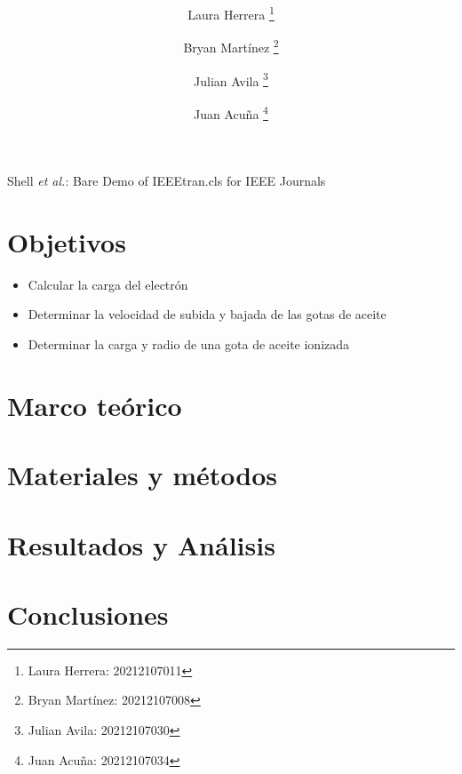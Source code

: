 \documentclass[journal, table]{IEEEtran}
\begin{document}
\title{\textbf{} \\
    \small{}}

\author[*]{Laura Herrera
    \thanks{Laura Herrera: 20212107011}}
\author[*]{Bryan Martínez
    \thanks{Bryan Martínez: 20212107008}}
\author[*]{Julian Avila
    \thanks{Julian Avila: 20212107030}}
\author[*]{Juan Acuña
    \thanks{Juan Acuña: 20212107034}}



\markboth{}
{Shell \MakeLowercase{\textit{et al.}}: Bare Demo of IEEEtran.cls for IEEE Journals}

\maketitle

\begin{abstract}

\end{abstract}

\begin{IEEEkeywords}

\end{IEEEkeywords}

\begin{abstract}

\end{abstract}

\begin{IEEEkeywords}

\end{IEEEkeywords}

\section{Objetivos}
\begin{itemize}
    \item Calcular la carga del electrón
    \item Determinar la velocidad de subida y bajada de las gotas de aceite
    \item Determinar la carga y radio de una gota de aceite ionizada
\end{itemize}

\section{Marco teórico}


\section{Materiales y métodos}


\section{Resultados y Análisis}


\section{Conclusiones}

\printbibliography
\end{document}
